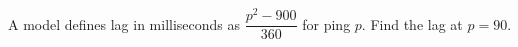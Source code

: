 A model defines lag in milliseconds as $\dfrac{p^2-900}{360}$ for ping $p$. Find the lag at $p=90$.
